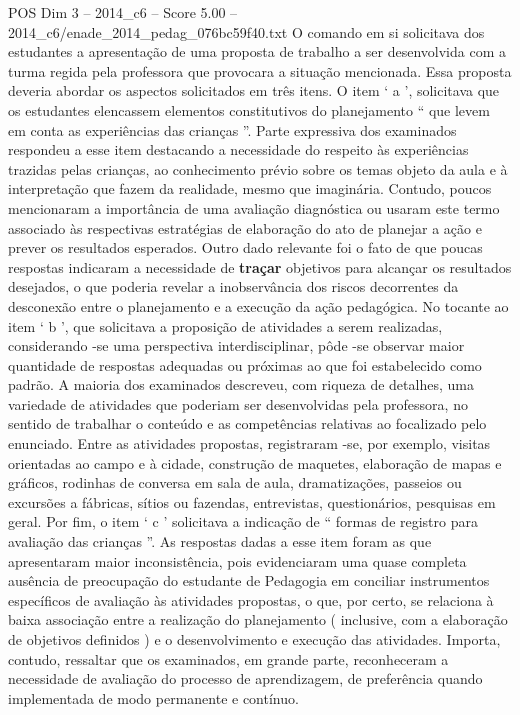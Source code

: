 \begin{textsample}{POS Dim 3 – 2014\_c6 – Score 5.00 – 2014\_c6/enade\_2014\_pedag\_076bc59f40.txt}
O comando em si solicitava dos estudantes a apresentação de uma proposta de trabalho a ser desenvolvida com a turma regida pela professora que provocara a situação mencionada.
Essa proposta deveria abordar os aspectos solicitados em três itens.
O item ‘ a ’, solicitava que os estudantes elencassem elementos constitutivos do planejamento “ que levem em conta as experiências das crianças ”.
Parte expressiva dos examinados respondeu a esse item destacando a necessidade do respeito às experiências trazidas pelas crianças, ao conhecimento prévio sobre os temas objeto da aula e à interpretação que fazem da realidade, mesmo que imaginária.
Contudo, poucos mencionaram a importância de uma avaliação diagnóstica ou usaram este termo associado às respectivas estratégias de elaboração do ato de planejar a ação e prever os resultados esperados.
Outro dado relevante foi o fato de que poucas respostas indicaram a necessidade de \textbf{traçar} objetivos para alcançar os resultados desejados, o que poderia revelar a inobservância dos riscos decorrentes da desconexão entre o planejamento e a execução da ação pedagógica.
No tocante ao item ‘ b ’, que solicitava a proposição de atividades a serem realizadas, considerando -se uma perspectiva interdisciplinar, pôde -se observar maior quantidade de respostas adequadas ou próximas ao que foi estabelecido como padrão.
A maioria dos examinados descreveu, com riqueza de detalhes, uma variedade de atividades que poderiam ser desenvolvidas pela professora, no sentido de trabalhar o conteúdo e as competências relativas ao focalizado pelo enunciado.
Entre as atividades propostas, registraram -se, por exemplo, visitas orientadas ao campo e à cidade, construção de maquetes, elaboração de mapas e gráficos, rodinhas de conversa em sala de aula, dramatizações, passeios ou excursões a fábricas, sítios ou fazendas, entrevistas, questionários, pesquisas em geral.
Por fim, o item ‘ c ’ solicitava a indicação de “ formas de registro para avaliação das crianças ”.
As respostas dadas a esse item foram as que apresentaram maior inconsistência, pois evidenciaram uma quase completa ausência de preocupação do estudante de Pedagogia em conciliar instrumentos específicos de avaliação às atividades propostas, o que, por certo, se relaciona à baixa associação entre a realização do planejamento ( inclusive, com a elaboração de objetivos definidos ) e o desenvolvimento e execução das atividades.
Importa, contudo, ressaltar que os examinados, em grande parte, reconheceram a necessidade de avaliação do processo de aprendizagem, de preferência quando implementada de modo permanente e contínuo.

\end{textsample}
